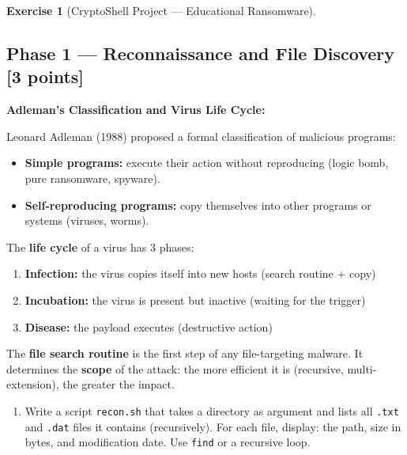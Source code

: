 \documentclass[a4paper,11pt]{article}
\theoremstyle{plain}
\theoremstyle{definition}
\newtheorem{exercice}{Exercise}
\begin{document}
\bigskip


\begin{exercice}[CryptoShell Project --- Educational Ransomware]$\;$


\subsection*{Phase 1 --- Reconnaissance and File Discovery \hfill \normalsize [3 points]}

\begin{rappel}
\textbf{Adleman's Classification and Virus Life Cycle:}

Leonard Adleman (1988) proposed a formal classification of malicious programs:
\begin{itemize}
    \item \textbf{Simple programs:} execute their action without reproducing (logic bomb, pure ransomware, spyware).
    \item \textbf{Self-reproducing programs:} copy themselves into other programs or systems (viruses, worms).
\end{itemize}

\medskip
The \textbf{life cycle} of a virus has 3 phases:
\begin{enumerate}
    \item \textbf{Infection:} the virus copies itself into new hosts (search routine + copy)
    \item \textbf{Incubation:} the virus is present but inactive (waiting for the trigger)
    \item \textbf{Disease:} the payload executes (destructive action)
\end{enumerate}

\medskip
The \textbf{file search routine} is the first step of any file-targeting malware. It determines the \textbf{scope} of the attack: the more efficient it is (recursive, multi-extension), the greater the impact.
\end{rappel}

\begin{enumerate}
\item[\textbf{1a)}] Write a script \texttt{recon.sh} that takes a directory as argument and lists all \texttt{.txt} and \texttt{.dat} files it contains (recursively). For each file, display: the path, size in bytes, and modification date. Use \texttt{find} or a recursive loop.


\end{enumerate}
\end{exercice}
\end{document}
